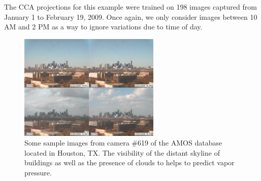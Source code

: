 The CCA projections for this example were trained on 198 images captured from January 1 to February 19, 2009. Once again, we only consider images between 10 AM and 2 PM as a way to ignore variations due to time of day.
\begin{figure}
	\centering
		\includegraphics[width=0.60\textwidth]{figures/vaporextremes.jpg}
	\caption[Some sample images from camera $\#$619 of the AMOS database located in Houston, TX]{Some sample images from camera $\#$619 of the AMOS database located in Houston, TX. The visibility of the distant skyline of buildings as well as the presence of clouds to helps to predict vapor pressure.}
	\label{fig:vaporextremes}
\end{figure}


